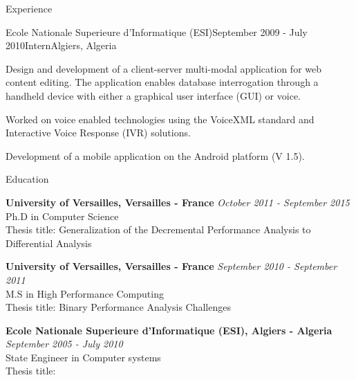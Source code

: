 \documentclass{resume} %
\begin{document}
\begin{rSection}{Experience}
\begin{rSubsection}{Ecole Nationale Superieure d'Informatique (ESI)}{September 2009 - July 2010}{Intern}{Algiers, Algeria}
\item Design and development of a client-server multi-modal application for web content editing. The application enables 
      database interrogation through a handheld device with either a graphical user interface (GUI) or voice.
\item Worked on voice enabled technologies using the VoiceXML standard and Interactive Voice Response (IVR) solutions.
\item Development of a mobile application on the Android platform (V 1.5).  
\end{rSubsection}


\begin{rSection}{Education}

{\bf University of Versailles, Versailles - France} \hfill {\em October 2011 - September 2015} \\ 
Ph.D in Computer Science\\
Thesis title: Generalization of the Decremental Performance Analysis to Differential Analysis

{\bf University of Versailles, Versailles - France} \hfill {\em September 2010 - September 2011} \\ 
M.S in High Performance Computing\\
Thesis title: Binary Performance Analysis Challenges

{\bf Ecole Nationale Superieure d'Informatique (ESI), Algiers - Algeria} \hfill {\em September 2005 - July 2010} \\ 
State Engineer in Computer systems\\
Thesis title: 
\end{rSection}





\end{rSection}
\end{document}
